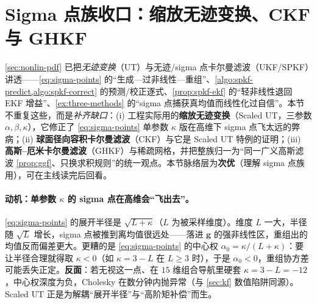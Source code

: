 \section{Sigma 点族收口：缩放无迹变换、CKF 与 GHKF}
\label{sec:sigma-family}

\cref{sec:nonlin-pdf} 已把\emph{无迹变换}（UT）与无迹/sigma 点卡尔曼滤波（UKF/SPKF）讲透——\cref{eq:sigma-points} 的“生成—过非线性—重组”、\cref{algo:spkf-predict,algo:spkf-correct} 的预测/校正逐式、\cref{prop:spkf-ekf} 的“轻非线性退回 EKF 增益”、\cref{ex:three-methods} 的“sigma 点捕获真均值而线性化过自信”。本节不重复这些，而是\emph{补齐缺口}：(i) 工程实际用的\textbf{缩放无迹变换}（Scaled UT，三参数 $\alpha,\beta,\kappa$），它修正了 \cref{eq:sigma-points} 单参数 $\kappa$ 版在高维下 sigma 点飞太远的弊病；(ii) \textbf{球面径向容积卡尔曼滤波}（CKF）与它是 Scaled UT 特例的证明；(iii) \textbf{高斯--厄米卡尔曼滤波}（GHKF）与稀疏网格，并把整族归一为“同一广义高斯滤波 \cref{prop:ggf}、只换求积规则”的统一观点。本节脉络层为\textbf{次优}（理解 sigma 点族用），可在主线读完后回看。

\paragraph{动机：单参数 $\kappa$ 的 sigma 点在高维会“飞出去”。}
\cref{eq:sigma-points} 的展开半径是 $\sqrt{L+\kappa}$（$L$ 为被采样维度）。维度 $L$ 一大，半径随 $\sqrt{L}$ 增长，sigma 点被推到离均值很远处——落进 $\mathbf{g}$ 的强非线性区，重组出的均值反而偏差更大\cite{vandermerwe2004sigma}。更糟的是 \cref{eq:sigma-points} 的中心权 $\alpha_0=\kappa/(L+\kappa)$：要让半径合理就得取 $\kappa<0$（如 $\kappa=3-L$ 在 $L\ge3$ 时），于是 $\alpha_0<0$，重组协方差可能丢失正定。\textbf{反面}：若无视这一点、在 $15$ 维组合导航里硬套 $\kappa=3-L=-12$，中心权深度为负，Cholesky 在数分钟内抛异常（与 \cref{sec:kf} 数值陷阱同源）。Scaled UT 正是为解耦“展开半径”与“高阶矩补偿”而生。

